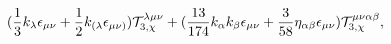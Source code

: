 \begin{equation}
(\frac{1}{3}k_{\lambda }\epsilon _{\mu \nu }+\frac{1}{2}k_{(\lambda
}\epsilon _{\mu \nu )})\mathcal{T}_{3,\chi }^{\lambda \mu \nu }+(\frac{13}{%
174}k_{\alpha }k_{\beta }\epsilon _{\mu \nu }+\frac{3}{58}\eta _{\alpha
\beta }\epsilon _{\mu \nu })\mathcal{T}_{3,\chi }^{\mu \nu \alpha \beta },
\end{equation}%
